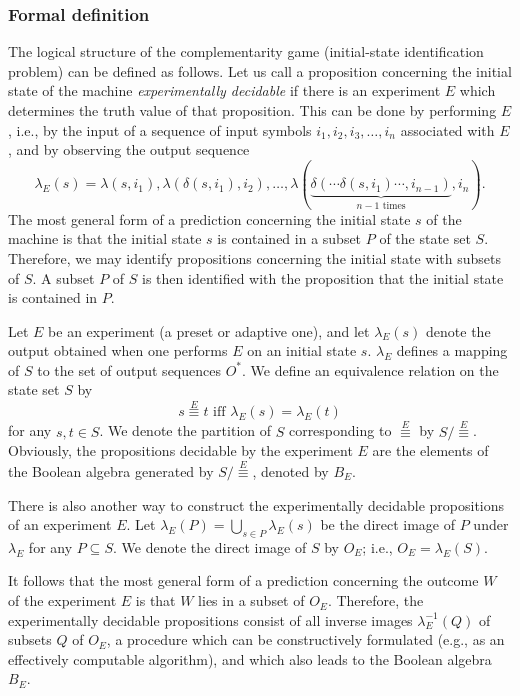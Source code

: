 \subsubsection*{Formal definition}
The logical structure of the complementarity game (initial-state
identification problem) can
be defined as follows. Let us call a proposition concerning the initial
state of the machine
{\em experimentally decidable} if there is an experiment $E$ which
determines the truth value of that proposition.
This can be done by performing $E$, i.e., by the input of a sequence of
input symbols $i_1,i_2,i_3,\ldots ,i_n$ associated with $E$, and by
observing the output sequence
$$\lambda_E(s)=\lambda(s,i_1),\lambda(\delta (s,i_1),i_2), \ldots
,\lambda(\underbrace{\delta
(\cdots
\delta
(s,i_1)\cdots ,i_{n-1})}_{n-1 \mbox{ times}},i_n).$$
The most general form of a prediction concerning the
initial state $s$
of the machine is that the initial state $s$ is contained in a subset
$P$ of the state set $S$.
Therefore, we may identify propositions concerning the initial state
with subsets of $S$.
A subset $P$ of $S$ is then  identified with the proposition that the
initial state is contained in $P$.

Let $E$ be an experiment (a preset or adaptive one), and let
$\lambda_E(s)$
denote the output obtained when one performs $E$ on an initial
state $s$.
$\lambda_E$ defines a mapping of $S$ to the set of output sequences
$O^*$. We define an equivalence relation on the state set $S$ by
$$s \stackrel{E}{\equiv} t \mbox{ iff }\lambda_E(s) = \lambda_E(t)$$
for any $s,t \in S$.
We denote the partition of $S$ corresponding to $\stackrel{E}{\equiv}$
by $S/\stackrel{E}{\equiv}$.
Obviously, the propositions decidable by the experiment $E$ are
the elements of the Boolean algebra generated by
$S/\stackrel{E}{\equiv}$, denoted by $B_E$.

There is also another way to construct the experimentally decidable
propositions of an experiment $E$.
Let $\lambda_E(P)  = \bigcup\limits_{s \in P}\lambda_E(s)$ be the direct
image of $P$ under $\lambda_E$ for any $P \subseteq S$.
We denote the direct image of $S$ by $O_E$; i.e.,  $O_E = \lambda_E(S)$.

It follows that the most general form of a prediction concerning
the outcome $W$ of the experiment $E$ is that $W$ lies in a subset of
$O_E$.
Therefore, the experimentally decidable propositions consist of all
inverse images $\lambda_E^{-1}(Q)$ of subsets $Q$ of $O_E$,
a procedure which can be constructively formulated (e.g., as an
effectively computable algorithm), and which also
leads to the Boolean algebra $B_E$.


